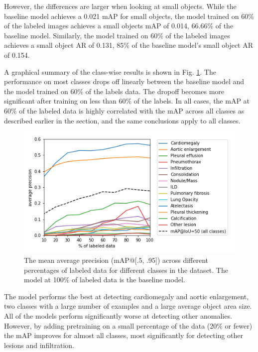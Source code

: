 \documentclass[conference]{IEEEtran}
\begin{document}
However, the differences are larger when looking at small objects. While the baseline model achieves a 0.021 mAP for small objects, the model trained on 60\% of the labeled images achieves a small objects mAP of 0.014, 66.66\% of the baseline model. Similarly, the model trained on 60\% of the labeled images achieves a small object AR of 0.131, 85\% of the baseline model's small object AR of 0.154. 

A graphical summary of the class-wise results is shown in Fig. \ref{fig:classwise-map}. The performance on most classes drops off linearly between the baseline model and the model trained on 60\% of the labels data. The dropoff becomes more significant after training on less than 60\% of the labels. In all cases, the mAP at 60\% of the labeled data is highly correlated with the mAP across all classes as described earlier in the section, and the same conclusions apply to all classes.

\begin{figure}[t]
\centering
\includegraphics[width=\columnwidth]{images/map_graph}
\caption{The mean average precision (mAP@[.5, .95]) across different percentages of labeled data for different classes in the dataset. The model at 100\% of labeled data is the baseline model.}
\label{fig:classwise-map}
\end{figure}

The model performs the best at detecting cardiomegaly and aortic enlargement, two classes with a large number of examples and a large average object area size. 
All of the models perform significantly worse at detecting other anomalies. However, by adding pretraining on a small percentage of the data (20\% or fewer) 
the mAP improves for almost all classes, most significantly for detecting other lesions and infiltration.
\end{document}
